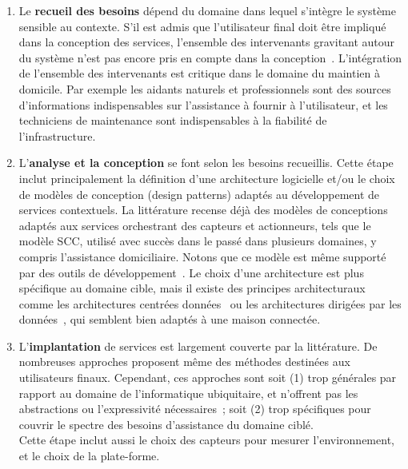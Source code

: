 \begin{enumerate}
\item Le {\bf recueil des besoins} dépend du domaine dans lequel
  s'intègre le système sensible au contexte. S'il est admis que
  l'utilisateur final doit être impliqué dans la conception des
  services, l'ensemble des intervenants gravitant autour du système
  n'est pas encore pris en compte dans la
  conception~\parencite{alegre2016engineering}. L'intégration de l'ensemble des
  intervenants est critique dans le domaine du maintien à
  domicile. Par exemple les aidants naturels et professionnels sont
  des sources d'informations indispensables sur l'assistance à fournir
  à l'utilisateur, et les techniciens de maintenance sont
  indispensables à la fiabilité de l'infrastructure.

\item L'{\bf analyse et la conception} se font selon les besoins recueillis. 
  Cette étape inclut principalement la définition d'une architecture
  logicielle et/ou le choix de modèles de conception (design patterns)
  adaptés au développement de services contextuels. La littérature
  recense déjà des modèles de conceptions adaptés aux services
  orchestrant des capteurs et actionneurs, tels que le modèle SCC,
  utilisé avec succès dans le passé dans plusieurs domaines, y compris
  l'assistance domiciliaire. Notons que ce modèle est même supporté
  par des outils de développement~\parencite{bertran2014diasuite}. Le
  choix d'une architecture est plus spécifique au domaine cible, mais
  il existe des principes architecturaux comme les architectures
  centrées données~\parencite{qin2016when} ou les architectures
  dirigées par les données~\parencite{chen2012knowledge}, qui semblent
  bien adaptés à une maison connectée.

\item L'{\bf implantation} de services est largement couverte par la
  littérature. De nombreuses approches proposent même des méthodes
  destinées aux utilisateurs finaux. Cependant, ces approches sont soit
  (1) trop générales par rapport au domaine de l'informatique
  ubiquitaire, et n'offrent pas les abstractions ou l'expressivité
  nécessaires~; soit (2) trop spécifiques pour couvrir le spectre des besoins
  d'assistance du domaine ciblé.\\
  Cette étape inclut aussi le choix des capteurs pour mesurer
  l'environnement, et le choix de la plate-forme.


\end{enumerate}
